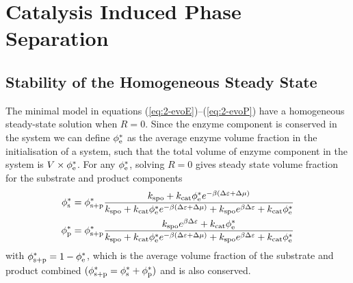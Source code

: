 \section{Catalysis Induced Phase Separation}
\subsection{Stability of the Homogeneous Steady State}
The minimal model in equations (\ref{eq:2-evoE})--(\ref{eq:2-evoP}) have a homogeneous steady-state solution when $R=0$. Since the enzyme component is conserved in the system we can define $\phi_{\mathrm{e}}^*$ as the average enzyme volume fraction in the initialisation of a system, such that the total volume of enzyme component in the system is $V \times \phi_{\mathrm{e}}^*$. For any $\phi_{\mathrm{e}}^*$, solving $R=0$ gives steady state volume fraction for the substrate and product components
\begin{align}
    \phi_{\mathrm{s}}^* &= \phi_{\mathrm{s+p}}^*\frac{k_{\mathrm{spo}} + k_{\mathrm{cat}}\phi_{\mathrm{e}}^*e^{-\beta(\Delta \varepsilon + \Delta\mu)}}{k_{\mathrm{spo}} + k_{\mathrm{cat}}\phi_{\mathrm{e}}^*e^{-\beta (\Delta \varepsilon + \Delta\mu)}+k_{\mathrm{spo}} e^{\beta \Delta \varepsilon} + k_{\mathrm{cat}}\phi_{\mathrm{e}}^*}
    \label{eq:2-sstar}
    \\
    \phi_{\mathrm{p}}^* &= \phi_{\mathrm{s+p}}^*\frac{k_{\mathrm{spo}} e^{\beta \Delta \varepsilon} + k_{\mathrm{cat}}\phi_{\mathrm{e}}^*}{k_{\mathrm{spo}} + k_{\mathrm{cat}}\phi_{\mathrm{e}}^*e^{-\beta (\Delta \varepsilon + \Delta\mu)}+k_{\mathrm{spo}} e^{\beta \Delta \varepsilon} + k_{\mathrm{cat}}\phi_{\mathrm{e}}^*}
    \label{eq:2-pstar}
\end{align}
with $\phi_{\mathrm{s+p}}^*=1-\phi_{\mathrm{e}}^*$, which is the average volume fraction of the substrate and product combined $(\phi_{\mathrm{s+p}}^*=\phi_{\mathrm{s}}^*+\phi_{\mathrm{p}}^*)$ and is also conserved.

